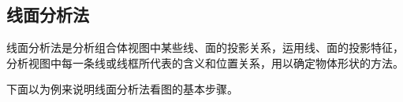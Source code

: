 \subsection{线面分析法}
线面分析法是分析组合体视图中某些线、面的投影关系，运用线、面的投影特征，分析视图中每一条线或线框所代表的含义和位置关系，用以确定物体形状的方法。

下面以为例来说明线面分析法看图的基本步骤。


\endinput